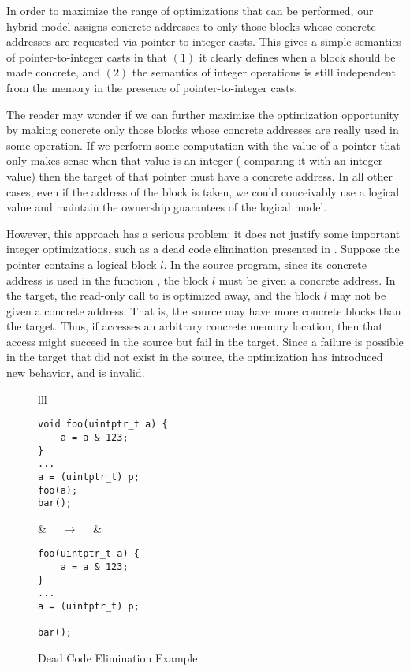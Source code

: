 In order to maximize the range of optimizations that can be performed, our hybrid model assigns
concrete addresses to only those blocks whose concrete addresses are requested via
pointer-to-integer casts.  This gives a simple semantics of pointer-to-integer casts in that $(1)$
it clearly defines when a block should be made concrete, and $(2)$ the semantics of integer
operations is still independent from the memory in the presence of pointer-to-integer casts.

The reader may wonder if we can further maximize the optimization opportunity by making concrete
only those blocks whose concrete addresses are really used in some operation.  If we perform some
computation with the value of a pointer that only makes sense when that value is an integer
(\eg %
comparing it with an integer value) then the target of that pointer must have a concrete address.
In all other cases, even if the address of the block is taken, we could conceivably use a logical
value and maintain the ownership guarantees of the logical model.

However, this approach has a serious problem: it does not justify some important integer
optimizations, such as a dead code elimination presented in
.  Suppose the pointer  contains a logical block
$l$. In the source program, since its concrete address is used in the function , the block
$l$ must be given a concrete address. In the target, the read-only call to  is optimized
away, and the block $l$ may not be given a concrete address. That is, the source may have more
concrete blocks than the target. Thus, if  accesses an arbitrary concrete memory
location, then that access might succeed in the source but fail in the target. Since a failure is
possible in the target that did not exist in the source, the optimization has introduced new
behavior, and is invalid.

\begin{figure}[t]
\small
\center
\begin{tabular}{lll}
\begin{minipage}{0.3\textwidth}
\begin{verbatim}
void foo(uintptr_t a) {
    a = a & 123;
}
...
a = (uintptr_t) p;
foo(a);
bar();
\end{verbatim}
\end{minipage}
&
$\quad\rightarrow\quad$
&
\begin{minipage}{0.3\textwidth}
\begin{verbatim}
foo(uintptr_t a) {
    a = a & 123;
}
...
a = (uintptr_t) p;

bar();
\end{verbatim}
\end{minipage}
\end{tabular}
\caption{Dead Code Elimination Example}
\label{fig:intptrcast:formal-semantics:dce}
\end{figure}


